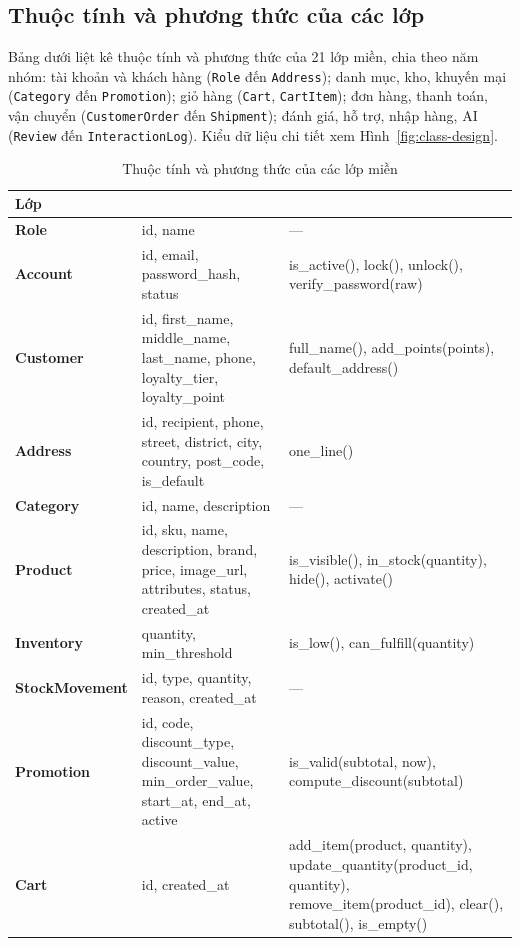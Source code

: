 \documentclass[12pt,a4paper,oneside]{report}
\begin{document}
\subsection{Thuộc tính và phương thức của các lớp}

Bảng dưới liệt kê thuộc tính và phương thức của 21 lớp miền, chia theo năm nhóm: tài khoản và khách hàng (\texttt{Role} đến \texttt{Address}); danh mục, kho, khuyến mại (\texttt{Category} đến \texttt{Promotion}); giỏ hàng (\texttt{Cart}, \texttt{CartItem}); đơn hàng, thanh toán, vận chuyển (\texttt{CustomerOrder} đến \texttt{Shipment}); đánh giá, hỗ trợ, nhập hàng, AI (\texttt{Review} đến \texttt{InteractionLog}). Kiểu dữ liệu chi tiết xem Hình~\ref{fig:class-design}.

\begin{longtable}{>{\raggedright\arraybackslash\small\bfseries}p{3.3cm}>{\raggedright\arraybackslash\ttfamily\footnotesize}p{6.2cm}>{\raggedright\arraybackslash\ttfamily\footnotesize}p{6.3cm}}
\caption{Thuộc tính và phương thức của các lớp miền}\\
\toprule
\textbf{Lớp} & \multicolumn{1}{l}{\textbf{Thuộc tính}} & \multicolumn{1}{l}{\textbf{Phương thức}} \\
\midrule
\endhead
\bottomrule
\endlastfoot
Role & id, name & --- \\
Account & id, email, password\_hash, status & is\_active(), lock(), unlock(), verify\_password(raw) \\
Customer & id, first\_name, middle\_name, last\_name, phone, loyalty\_tier, loyalty\_point & full\_name(), add\_points(points), default\_address() \\
Address & id, recipient, phone, street, district, city, country, post\_code, is\_default & one\_line() \\
Category & id, name, description & --- \\
Product & id, sku, name, description, brand, price, image\_url, attributes, status, created\_at & is\_visible(), in\_stock(quantity), hide(), activate() \\
Inventory & quantity, min\_threshold & is\_low(), can\_fulfill(quantity) \\
StockMovement & id, type, quantity, reason, created\_at & --- \\
Promotion & id, code, discount\_type, discount\_value, min\_order\_value, start\_at, end\_at, active & is\_valid(subtotal, now), compute\_discount(subtotal) \\
Cart & id, created\_at & add\_item(product, quantity), update\_quantity(product\_id, quantity), remove\_item(product\_id), clear(), subtotal(), is\_empty() \\

\end{longtable}
\end{document}
